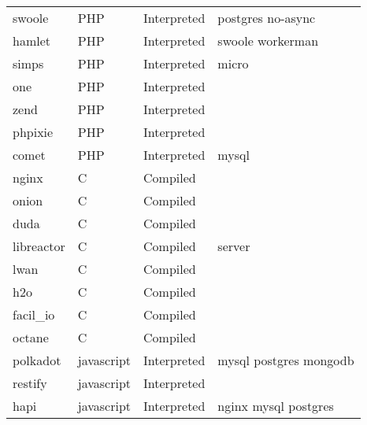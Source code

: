 \begin{longtable}{llll}
    swoole           & PHP         & Interpreted & postgres no-async                                  \\
    hamlet           & PHP         & Interpreted & swoole workerman                                   \\
    simps            & PHP         & Interpreted & micro                                              \\
    one              & PHP         & Interpreted &                                                    \\
    zend             & PHP         & Interpreted &                                                    \\
    phpixie          & PHP         & Interpreted &                                                    \\
    comet            & PHP         & Interpreted & mysql                                              \\
    nginx            & C           & Compiled    &                                                    \\
    onion            & C           & Compiled    &                                                    \\
    duda             & C           & Compiled    &                                                    \\
    libreactor       & C           & Compiled    & server                                             \\
    lwan             & C           & Compiled    &                                                    \\
    h2o              & C           & Compiled    &                                                    \\
    facil\_io        & C           & Compiled    &                                                    \\
    octane           & C           & Compiled    &                                                    \\
    polkadot         & javascript  & Interpreted & mysql postgres mongodb                             \\
    restify          & javascript  & Interpreted &                                                    \\
    hapi             & javascript  & Interpreted & nginx mysql postgres                               \\

\end{longtable}

